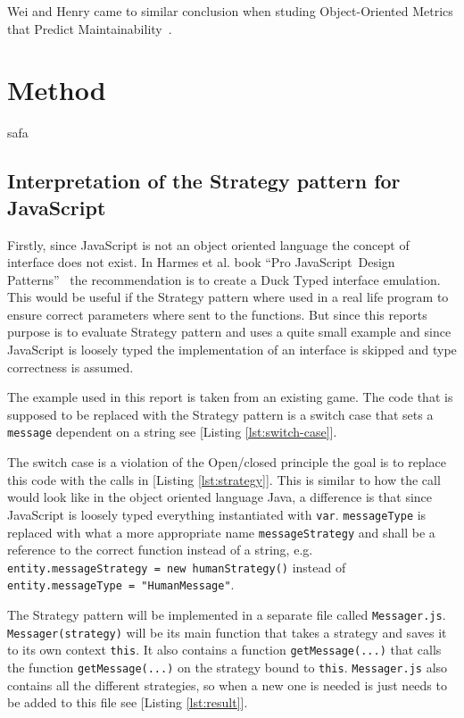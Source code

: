 \documentclass[conference, a4paper]{IEEEtran}
\begin{document}
Wei and Henry came to similar conclusion when studing Object-Oriented Metrics that Predict Maintainability~\cite{bibitem:WeiHenry}.

\section{Method}
safa

\subsection{Interpretation of the Strategy pattern for JavaScript}
Firstly, since JavaScript is not an object oriented language the concept of interface does not exist. In Harmes et al. book ``Pro JavaScript\texttrademark~Design Patterns''~\cite{bibitem:DiazHarmes} the recommendation is to create a Duck Typed interface emulation. This would be useful if the Strategy pattern where used in a real life program to ensure correct parameters where sent to the functions. But since this reports purpose is to evaluate Strategy pattern and uses a quite small example and since JavaScript is loosely typed the implementation of an interface is skipped and type correctness is assumed.

The example used in this report is taken from an existing game. The code that is supposed to be replaced with the Strategy pattern is a switch case that sets a \texttt{message} dependent on a string see [Listing \ref{lst:switch-case}].

The switch case is a violation of the Open/closed principle the goal is to replace this code with the calls in [Listing \ref{lst:strategy}]. This is similar to how the call would look like in the object oriented language Java, a difference is that since JavaScript is loosely typed everything instantiated with \texttt{var}. \texttt{messageType} is replaced with what a more appropriate name \texttt{messageStrategy} and shall be a reference to the correct function instead of a string, e.g. \texttt{entity.messageStrategy = new humanStrategy()} instead of \texttt{entity.messageType = "HumanMessage"}.

The Strategy pattern will be implemented in a separate file called \texttt{Messager.js}. \texttt{Messager(strategy)} will be its main function that takes a strategy and saves it to its own context \texttt{this}. It also contains a function \texttt{getMessage(...)} that calls the function \texttt{getMessage(...)} on the strategy bound to \texttt{this}. \texttt{Messager.js} also contains all the different strategies, so when a new one is needed is just needs to be added to this file see [Listing \ref{lst:result}].
\end{document}
